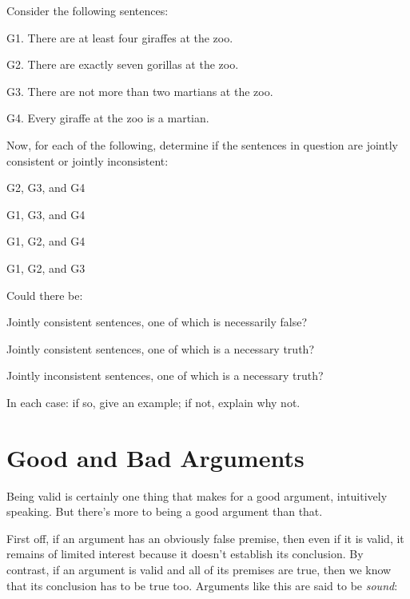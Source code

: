 \problempart
\label{pr.MartianGiraffes}
Consider the following sentences:

	\begin{ebullet}
		\item[G1.] There are at least four giraffes at the zoo.
		\item[G2.] There are exactly seven gorillas at the zoo.
		\item[G3.] There are not more than two martians at the zoo.
		\item[G4.] Every giraffe at the zoo is a martian.
	\end{ebullet}
	
Now, for each of the following, determine if the sentences in question are jointly consistent or jointly inconsistent:

\begin{earg}
\item G2, G3, and G4
\item G1, G3, and G4
\item G1, G2, and G4
\item G1, G2, and G3
\end{earg}


\problempart
Could there be:
	\begin{earg}
		\item Jointly consistent sentences, one of which is necessarily false?
		\item Jointly consistent sentences, one of which is a necessary truth?
		\item Jointly inconsistent sentences, one of which is a necessary truth?
	\end{earg}
In each case: if so, give an example; if not, explain why not.




\section{Good and Bad Arguments}\label{s:GoodBadArg}

Being valid is certainly one thing that makes for a good argument, intuitively speaking.  But there's more to being a good argument than that.

First off, if an argument has an obviously false premise, then even if it is valid, it remains of limited interest because it doesn't establish its conclusion.  By contrast, if an argument is valid and all of its premises are true, then we know that its conclusion has to be true too.  Arguments like this are said to be \emph{sound}:

